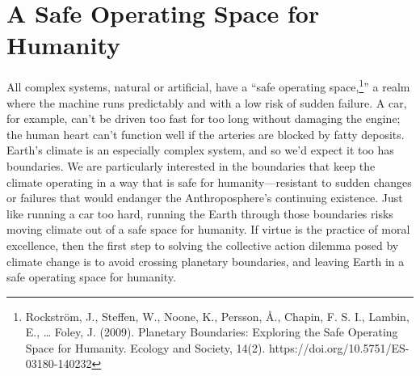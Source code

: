 \documentclass[amstex,12pt]{book}
\begin{document}

\section{A Safe Operating Space for Humanity}
All complex systems, natural or artificial, have a ``safe operating space,\footnote{Rockstr\"{o}m, J., Steffen, W., Noone, K., Persson, Å., Chapin, F. S. I., Lambin, E., … Foley, J. (2009). Planetary Boundaries: Exploring the Safe Operating Space for Humanity. Ecology and Society, 14(2). https://doi.org/10.5751/ES-03180-140232}'' a realm where the machine runs predictably and with a low risk of sudden failure. A car, for example, can't be driven too fast for too long without damaging the engine; the human heart can't function well if the arteries are blocked by fatty deposits. Earth's climate is an especially complex system, and so we'd expect it too has boundaries. We are particularly interested in the boundaries that keep the climate operating in a way that is safe for humanity---resistant to sudden changes or failures that would endanger the Anthroposphere's continuing existence. Just like running a car too hard, running the Earth through those boundaries risks moving climate out of a safe space for humanity. If virtue is the practice of moral excellence, then the first step to solving the collective action dilemma posed by climate change is to avoid crossing planetary boundaries, and leaving Earth in a safe operating space for humanity.
 
\end{document}
